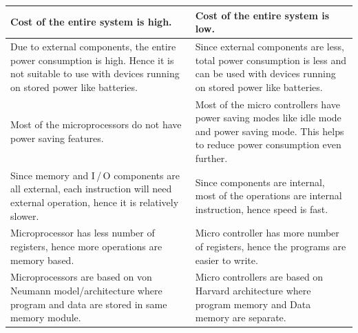 {\begin{longtable}{|p{6.8cm}|p{6.8cm}|}
\hline
Cost of the entire system is high. & Cost of the entire system is low.\\
\hline
Due to external components, the entire power consumption is high. Hence it is not suitable to use with devices running on stored power like batteries. & Since external components are less, total power consumption is less and can be used with devices running on stored power like batteries.\\
\hline
Most of the microprocessors do not have power saving features. & Most of the micro controllers have power saving modes like idle mode and power saving mode. This helps to reduce power consumption even further.\\
\hline
Since memory and I\,/\,O components are all external, each instruction will need external operation, hence it is relatively slower. & Since components are internal, most of the operations are internal instruction, hence speed is fast.\\
\hline
Microprocessor has less number of registers, hence more operations are memory based. & Micro controller has more number of registers, hence the programs are easier to write.\\
\hline
Microprocessors are based on von Neumann model/architecture where program and data are stored in same memory module. & Micro controllers are based on Harvard architecture where program memory and Data memory are separate.\\
\hline
\end{longtable}}
